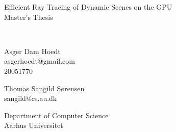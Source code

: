 \documentclass[a4paper,english]{report}
\begin{document}
\begin{titlepage}

\thispagestyle{empty}
\centering
    { \baselineskip=24pt
      \vspace*{80pt}
              {\LARGE Efficient Ray Tracing of Dynamic Scenes on the
                GPU} \\
              Master's Thesis
              \vspace*{20pt}
              \\
              \vspace*{40pt}
              \\
              \begin{minipage}{0.4\textwidth}
                \centering
                Asger Dam Hoedt \\ asgerhoedt@gmail.com \\ 20051770
              \end{minipage}
              \begin{minipage}{0.4\textwidth}
                \centering
                Thomas Sangild Sørensen \\ sangild@cs.au.dk
              \end{minipage}
    }
    \vfill
    \small
    Department of Computer Science\\
    Aarhus Universitet
\end{titlepage}

\clearpage{}



\tableofcontents

\clearpage{}


\end{document}

